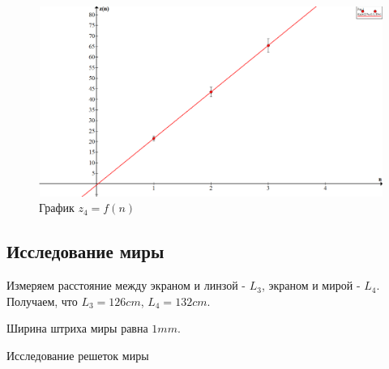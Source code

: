 \begin{figure}[h!]
  \centering
  \includegraphics[width=13cm]{pics/lab_436_4.png}
  \caption{График $z_4 = f(n)$}
  \label{}
\end{figure}


\subsection{Исследование миры}

Измеряем расстояние между экраном и линзой - $L_3$, экраном и мирой - $L_4$.
Получаем, что $L_3 = 126 cm$, $L_4 = 132 cm$.

Ширина штриха миры равна $1 mm$.




\begin{table}[h!]
	\centering
	
	\caption{Исследование решеток миры}
	\label{tb2_1}
\end{table}

